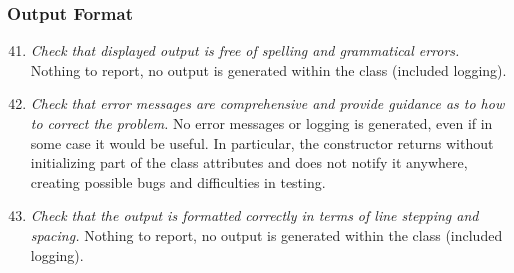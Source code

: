 	\subsubsection{Output Format}
		\begin{enumerate}
			\setcounter{enumi}{40}
			\item \textit{Check that displayed output is free of spelling and grammatical errors.}\newline
			Nothing to report, no output is generated within the class (included logging). %

			\item \textit{Check that error messages are comprehensive and provide guidance as to how to correct the problem.}\newline
			No error messages or logging is generated, even if in some case it would be useful. In particular, the constructor returns without initializing part of the class attributes and does not notify it anywhere, creating possible bugs and difficulties in testing.

			\item \textit{Check that the output is formatted correctly in terms of line stepping and spacing.}\newline
			Nothing to report, no output is generated within the class (included logging). %
		\end{enumerate}

